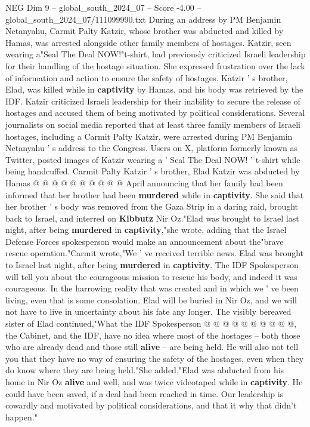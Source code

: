 \begin{textsample}{NEG Dim 9 – global\_south\_2024\_07 – Score -4.00 – global\_south\_2024\_07/111099990.txt}  \label{ex:f9_neg_339}
During an address by PM Benjamin Netanyahu, Carmit Palty Katzir, whose brother was abducted and killed by Hamas, was arrested alongside other family members of hostages.
Katzir, seen wearing a"Seal The Deal NOW!"t-shirt, had previously criticized Israeli leadership for their handling of the hostage situation.
She expressed frustration over the lack of information and action to ensure the safety of hostages.
Katzir ' s brother, Elad, was killed while in \textbf{captivity} by Hamas, and his body was retrieved by the IDF.
Katzir criticized Israeli leadership for their inability to secure the release of hostages and accused them of being motivated by political considerations.
Several journalists on social media reported that at least three family members of Israeli hostages, including a Carmit Palty Katzir, were arrested during PM Benjamin Netanyahu ' s address to the Congress.
Users on X, platform formerly known as Twitter, posted images of Katzir wearing a ' Seal The Deal NOW! ' t-shirt while being handcuffed.
Carmit Palty Katzir ' s brother, Elad Katzir was abducted by Hamas @ @ @ @ @ @ @ @ @ @ April announcing that her family had been informed that her brother had been \textbf{murdered} while in \textbf{captivity}.
She said that her brother ' s body was removed from the Gaza Strip in a daring raid, brought back to Israel, and interred on \textbf{Kibbutz} Nir Oz."Elad was brought to Israel last night, after being \textbf{murdered} in \textbf{captivity},"she wrote, adding that the Israel Defense Forces spokesperson would make an announcement about the"brave rescue operation."Carmit wrote,"We ' ve received terrible news.
Elad was brought to Israel last night, after being \textbf{murdered} in \textbf{captivity}.
The IDF Spokesperson will tell you about the courageous mission to rescue his body, and indeed it was courageous.
In the harrowing reality that was created and in which we ' ve been living, even that is some consolation.
Elad will be buried in Nir Oz, and we will not have to live in uncertainty about his fate any longer.
The visibly bereaved sister of Elad continued,"What the IDF Spokesperson @ @ @ @ @ @ @ @ @ @, the Cabinet, and the IDF, have no idea where most of the hostages -- both those who are already dead and those still \textbf{alive} -- are being held.
He will also not tell you that they have no way of ensuring the safety of the hostages, even when they do know where they are being held."She added,"Elad was abducted from his home in Nir Oz \textbf{alive} and well, and was twice videotaped while in \textbf{captivity}.
He could have been saved, if a deal had been reached in time.
Our leadership is cowardly and motivated by political considerations, and that it why that didn't happen."

\end{textsample}
